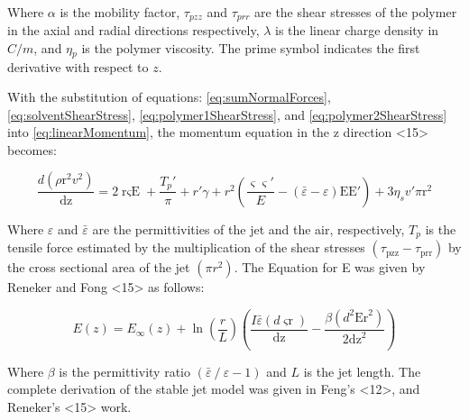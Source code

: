 Where $\alpha$ is the mobility factor, $\tau_{pzz}$ and $\tau_{prr}$ are the shear stresses of the polymer in the axial and radial directions respectively, $\lambda$ is the linear charge density in $C/m$, and $\eta{_p}$ is the polymer viscosity. The prime symbol indicates the first derivative with respect to $z$.

With the substitution of equations: \ref{eq:sumNormalForces}, \ref{eq:solventShearStress}, \ref{eq:polymer1ShearStress}, and \ref{eq:polymer2ShearStress} into \ref{eq:linearMomentum}, the momentum equation in the z direction <15> becomes:

\begin{equation}
\frac{d \left(\text{$\rho $r}^2 v^2\right)}{\text{dz}}=2
   \text{r$\varsigma$E}+\frac{T_p'}{\pi }+r' \gamma +r^2
   \left(\frac{\varsigma\varsigma'}{E}-\left(\bar{\varepsilon }-\varepsilon \right)
   \text{EE}'\right)+3 \eta _s v' \text{$\pi $r}^2
\label{eq:linearMomentumExpand}
\end{equation}

Where $\varepsilon$ and $\bar{\varepsilon}$ are the permittivities of the jet and the air, respectively, $T_{p}$ is the tensile force estimated by the multiplication of the shear stresses $\left(\tau_{\text{pzz}}-\tau_{\text{prr}}\right)$ by the cross sectional area of the jet $\left(\pi r^{2}\right)$. The Equation for E was given by Reneker and Fong <15> as follows:

\begin{equation}
E\left(z\right)=E_{\infty }\left(z\right)+\ln\left(\frac{r}{L}\right) \left(\frac{I \bar{\varepsilon } (d
   \text{$\varsigma$r})}{\text{dz}}-\frac{\beta  \left(d^2 \text{Er}^2\right)}{2
   \text{dz}^2}\right)
\label{eq:Eequation}
\end{equation}

Where $\beta$ is the permittivity ratio $\left(\bar{\varepsilon } \mathbin{/} \varepsilon -1\right)$ and $L$ is the jet length. The complete derivation of the stable jet model was given in Feng's <12>, and Reneker's <15> work.